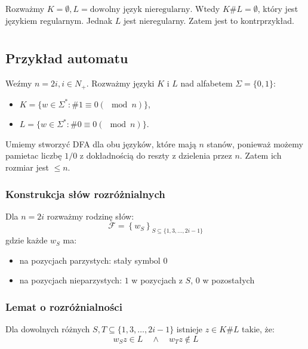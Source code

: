 \documentclass{article}
\theoremstyle{definition}
\theoremstyle{remark}
\begin{document}
Rozważmy \(K = \emptyset, L = \text{dowolny język nieregularny}\). Wtedy
\(K \# L = \emptyset\), który jest językiem regularnym. Jednak \(L\)
jest nieregularny. Zatem jest to kontrprzykład.

\section{}

\subsection{Przykład automatu}

Weźmy \(n = 2i, i \in N_+\).
Rozważmy języki \(K\) i \(L\) nad alfabetem \(\Sigma = \{0, 1\}\):
\begin{itemize}
    \item \(K = \{ w \in \Sigma^* : \# 1 \equiv 0 (\mod n) \}\),
    \item \(L = \{ w \in \Sigma^* : \# 0 \equiv 0 (\mod n) \}\).
\end{itemize}

Umiemy stworzyć DFA dla obu języków, które mają \(n\) stanów,
ponieważ możemy pamietac liczbę \(1/0\) z dokładnością do reszty z dzielenia przez \(n\).
Zatem ich rozmiar jest \(\leq n\).

\subsubsection{Konstrukcja słów rozróżnialnych}
Dla $n = 2i$ rozważmy rodzinę słów:
\[
\mathcal{F} = \left\{ w_S \right\} _{S \subseteq \{1,3,\dots,2i-1\}}
\]
gdzie każde $w_S$ ma:
\begin{itemize}
    \item na pozycjach parzystych: stały symbol $0$
    \item na pozycjach nieparzystych: $1$ w pozycjach z $S$, $0$ w pozostałych
\end{itemize}

\subsubsection{Lemat o rozróżnialności}
Dla dowolnych różnych $S, T \subseteq \{1,3,\dots,2i-1\}$ istnieje \(z \in K \# L\) takie, że:
\[
w_S z \in L \quad \land \quad w_T z \notin L
\]
\end{document}
